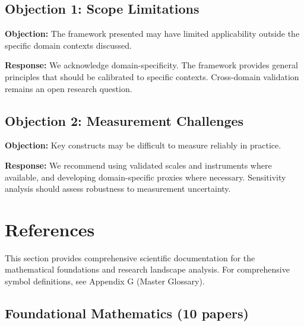 \subsection{Objection 1: Scope Limitations}

\textbf{Objection:} The framework presented may have limited applicability
outside the specific domain contexts discussed.

\textbf{Response:} We acknowledge domain-specificity. The framework provides
general principles that should be calibrated to specific contexts. Cross-domain
validation remains an open research question.

\subsection{Objection 2: Measurement Challenges}

\textbf{Objection:} Key constructs may be difficult to measure reliably in
practice.

\textbf{Response:} We recommend using validated scales and instruments where
available, and developing domain-specific proxies where necessary. Sensitivity
analysis should assess robustness to measurement uncertainty.


\section{References}

\nocite{bcm_master}

\label{sec:references}

This section provides comprehensive scientific documentation for the mathematical foundations and research landscape analysis.
For comprehensive symbol definitions, see Appendix G (Master Glossary).

\subsection{Foundational Mathematics (10 papers)}

